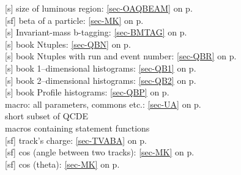  
 [s] size of luminous region: \ref{sec-OAQBEAM} on p.~\pageref{sec-OAQBEAM}\\
 [sf] beta of a particle: \ref{sec-MK} on p.~\pageref{sec-MK}\\
 [s] Invariant-mass b-tagging: \ref{sec-BMTAG} on p.~\pageref{sec-BMTAG}\\
 [s] book Ntuples: \ref{sec-QBN} on p.~\pageref{sec-QBN}\\
 [s] book Ntuples with run and event number:
 \ref{sec-QBR} on p.~\pageref{sec-QBR}\\
 [s] book 1--dimensional histograms: \ref{sec-QB1} on p.~\pageref{sec-QB1}\\
 [s] book 2--dimensional histograms: \ref{sec-QB2} on p.~\pageref{sec-QB2}\\
 [s] book Profile histograms: \ref{sec-QBP} on p.~\pageref{sec-QBP}\\
 macro: all parameters, commons etc.: \ref{sec-UA} on p.~\pageref{sec-UA}\\
 short subset of QCDE\\
 macros containing statement functions\\
 [sf] track's charge: \ref{sec-TVABA} on p.~\pageref{sec-TVABA}\\
 [sf] cos (angle between two tracks):
 \ref{sec-MK} on p.~\pageref{sec-MK}\\
 [sf] cos (theta): \ref{sec-MK} on p.~\pageref{sec-MK}
 
